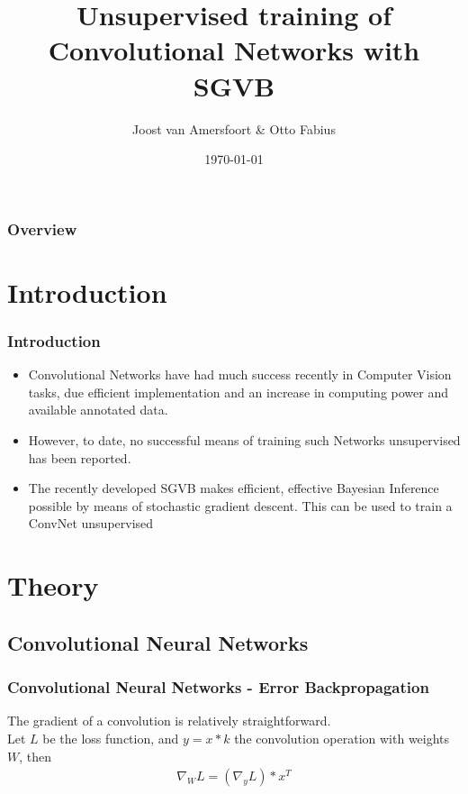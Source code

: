 \documentclass{beamer}
\title[Project Learning Systems]{Unsupervised training of Convolutional Networks with SGVB}
\author{Joost van Amersfoort \& Otto Fabius}
\institute[UvA] 
{University of Amsterdam
\medskip
}
\date{\today} %
\begin{document}
\begin{frame}
\titlepage %
\end{frame}

\begin{frame}
\frametitle{Overview}
\tableofcontents 
\end{frame}


\section{Introduction}


\begin{frame}
\frametitle{Introduction}
\begin{itemize}
	\item Convolutional Networks have had much success recently in Computer Vision tasks, due efficient implementation and an increase in computing power and available annotated data.
	\item However, to date, no successful means of training such Networks unsupervised has been reported.
	\item The recently developed SGVB makes efficient, effective Bayesian Inference possible by means of stochastic gradient descent. This can be used to train a ConvNet unsupervised
\end{itemize}
\end{frame}

\section{Theory}

\subsection{Convolutional Neural Networks}
\begin{frame}
\frametitle{Convolutional Neural Networks - Error Backpropagation}
The gradient of a convolution is relatively straightforward.\\ Let $L$ be the loss function, and $y = x * k$ the convolution operation with weights $W$, then \\   

\begin{align*}
\nabla_W L = (\nabla_y L) * x^T 
\end{align*}

\end{frame}
\end{document}
